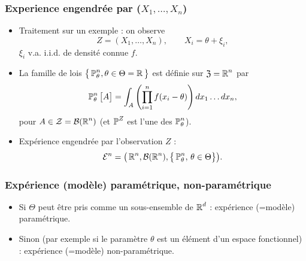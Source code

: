 \begin{frame}
\frametitle{Experience engendrée par ($X_1,\ldots, X_n$)}
\begin{itemize}
\item \alert{Traitement sur un exemple} : on observe
$$Z = (X_1,\ldots, X_n), \quad\quad X_i= \theta + \xi_i,$$
$\xi_i$ v.a. i.i.d. de densit\'e \alert{ connue} $f$.
\item La famille de lois $\big\{\operatorname{{\mathbb P}}_\theta^n,\theta \in \Theta  =
\operatorname{{\mathbb R}}\big\}$ est définie sur $\mathfrak{Z}=\operatorname{{\mathbb R}}^n$ par
$$\operatorname{{\mathbb P}}_\theta^n\big[A\big] = \int_A
\left(\prod_{i=1}^n f(x_i-\theta)\right) dx_1\ldots dx_n,
$$
pour $A\in{\mathcal Z}= {\mathcal B}(\operatorname{{\mathbb R}}^n)$ (et $\operatorname{{\mathbb P}}^Z$ est l'une
des $\operatorname{{\mathbb P}}_\theta^n$).
\item Expérience \alert{engendrée par l'observation $Z$} :
$${\mathcal E}^n = \big(\operatorname{{\mathbb R}}^n,{\mathcal B}(\operatorname{{\mathbb R}}^n),\big\{\operatorname{{\mathbb P}}_\theta^n,\,\theta \in \Theta\big\}\big).$$
\end{itemize}
\end{frame}


\begin{frame}
\frametitle{Expérience (mod\`ele) paramétrique, non-paramétrique}
\begin{itemize}
\item Si $\Theta$ peut être  pris  comme un sous-ensemble
de $\operatorname{{\mathbb R}}^d$ : \alert{ expérience (=mod\`ele) paramétrique}.
\item Sinon (par exemple si le paramètre $\theta$ est un élément d'un espace fonctionnel) : \alert{ expérience (=mod\`ele) non-paramétrique}.
\end{itemize}
\end{frame}

